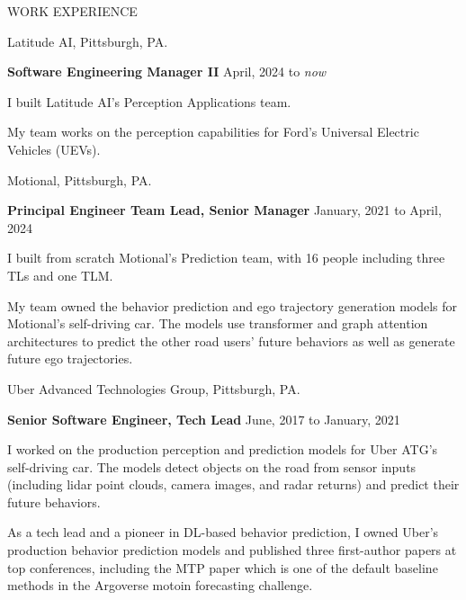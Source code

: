 \documentclass{resume} %
\begin{document}
\begin{rSection}{WORK EXPERIENCE}

\begin{rSubsection}{\hspace{-1em} Latitude AI, Pittsburgh, PA.}{}{}{}
\item[] \hspace{-2em} {\bf Software Engineering Manager II} \hfill April, 2024 to \emph{now}
\item I built Latitude AI's Perception Applications team.
\item My team works on the perception capabilities for Ford's Universal Electric Vehicles (UEVs).
\end{rSubsection}

\begin{rSubsection}{\hspace{-1em} Motional, Pittsburgh, PA.}{}{}{}
\item[] \hspace{-2em} {\bf Principal Engineer Team Lead, Senior Manager} \hfill January, 2021 to April, 2024
\item I built from scratch Motional's Prediction team, with 16 people including three TLs and one TLM.
\item My team owned the behavior prediction and ego trajectory generation models for Motional's self-driving car. The models use transformer and graph attention architectures to predict the other road users' future behaviors as well as generate future ego trajectories.
\end{rSubsection}

\begin{rSubsection}{\hspace{-1em} Uber Advanced Technologies Group, Pittsburgh, PA.}{}{}{}
\item[] \hspace{-2em} {\bf Senior Software Engineer, Tech Lead} \hfill June, 2017 to January, 2021
\item I worked on the production perception and prediction models for Uber ATG's self-driving car. The models detect objects on the road from sensor inputs (including lidar point clouds, camera images, and radar returns) and predict their future behaviors.
\item As a tech lead and a pioneer in DL-based behavior prediction, I owned Uber's production behavior prediction models and published three first-author papers at top conferences, including the MTP paper which is one of the default baseline methods in the Argoverse motoin forecasting challenge.
\end{rSubsection}
\end{rSection}
\end{document}
